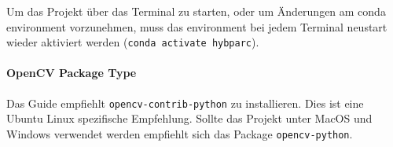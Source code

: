 \documentclass[a4paper]{article}
\newcommand{\code}[1]{\texttt{#1}}
\begin{document}
Um das Projekt über das Terminal zu starten, oder um Änderungen am conda environment vorzunehmen, muss das environment bei jedem Terminal neustart wieder aktiviert werden (\code{conda activate hybparc}).

\paragraph{OpenCV Package Type}
Das Guide empfiehlt \code{opencv-contrib-python} zu installieren. Dies ist eine Ubuntu Linux spezifische Empfehlung. Sollte das Projekt unter MacOS und Windows verwendet werden empfiehlt sich das Package \code{opencv-python}.
\end{document}
